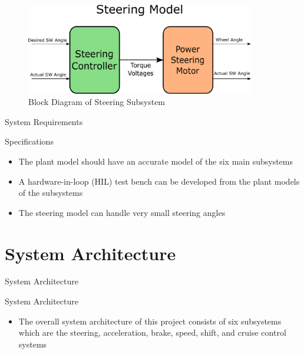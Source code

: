 \documentclass{beamer}
\begin{document}
\begin{frame}			
	\begin{figure}
		\includegraphics[width=10cm]{figs/inkscape/steeringModelArchitecture}
		\caption{Block Diagram of Steering Subsystem}
		\label{fig:steeringModel}
	\end{figure}
\end{frame}

\begin{frame}{System Requirements}
  \begin{block}{Specifications}
    \begin{itemize}
      	\item The plant model should have an accurate model of the six main subsystems
    		\item A hardware-in-loop (HIL) test bench can be developed from the plant models of the subsystems
    		\item The steering model can handle very small steering angles
    \end{itemize}
  \end{block}
\end{frame}


\section{System Architecture}

\begin{frame}{System Architecture}
  \begin{block}{System Architecture}
 \begin{itemize}
        \item The overall system architecture of this project consists of six subsystems which are the steering, acceleration, brake, speed, shift, and cruise control systems
\end{itemize}
  \end{block}
\end{frame}

\end{document}
